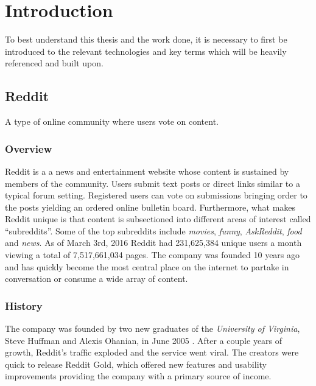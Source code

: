 \documentclass[msc,oneside]{ubcthesis}%
\begin{document}

\mainmatter


\chapter{Introduction}
To best understand this thesis and the work done, it is necessary to first be introduced to the relevant technologies and key terms which will be heavily referenced and built upon.

\section{Reddit}
A type of online community where users vote on content.

\subsection{Overview}
Reddit is a a news and entertainment website whose content is sustained by members of the community. Users submit text posts or direct links similar to a typical forum setting. Registered users can vote on submissions bringing order to the posts yielding an ordered online bulletin board. Furthermore, what makes Reddit unique is that content is subsectioned into different areas of interest called ``subreddits''. Some of the top subreddits include \textit{movies}, \textit{funny}, \textit{AskReddit}, \textit{food} and \textit{news}. As of March 3rd, 2016 Reddit had 231,625,384 unique users a month viewing a total of 7,517,661,034 pages. The company was founded 10 years ago and has quickly become the most central place on the internet to partake in conversation or consume a wide array of content.

\subsection{History}
The company was founded by two new graduates of the \textit{University of Virginia}, Steve Huffman and Alexis Ohanian, in June 2005 \citep{Guardian}. After a couple years of growth, Reddit's traffic exploded and the service went viral. The creators were quick to release Reddit Gold, which offered new features and usability improvements providing the company with a primary source of income.
\end{document}
